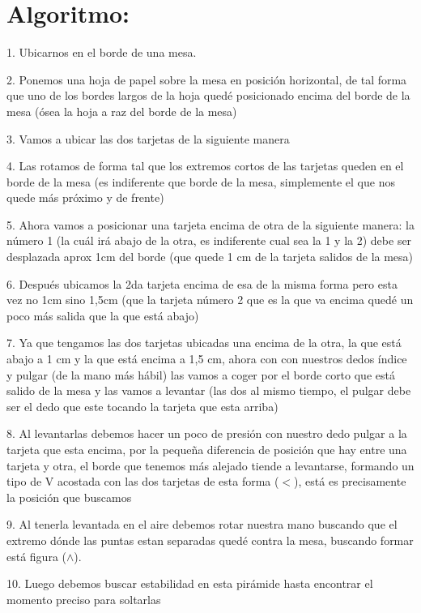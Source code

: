 \documentclass{article}
\begin{document}
\section{Algoritmo:} \label{contenido} 
1. Ubicarnos en el borde de una mesa.\par
2. Ponemos una hoja de papel sobre la mesa en posición horizontal, de tal forma que uno de los bordes largos de la hoja quedé posicionado encima del borde de la mesa (ósea la hoja a raz del borde de la mesa)\par
3. Vamos a ubicar las dos tarjetas de la siguiente manera\par
4. Las rotamos de forma tal que los extremos cortos de las tarjetas queden en el borde de la mesa (es indiferente que borde de la mesa, simplemente el que nos quede más próximo y de frente)\par
5. Ahora vamos a posicionar una tarjeta encima de otra de la siguiente manera: la número 1 (la cuál irá abajo de la otra, es indiferente cual sea la 1 y la 2) debe ser desplazada aprox 1cm del borde (que quede 1 cm de la tarjeta salidos de la mesa)\par
6. Después ubicamos la 2da tarjeta encima de esa de la misma forma pero esta vez no 1cm sino 1,5cm (que la tarjeta número 2 que es la que va encima quedé un poco más salida que la que está abajo)\par
7. Ya que tengamos las dos tarjetas ubicadas una encima de la otra, la que está abajo a 1 cm y la que está encima a 1,5 cm, ahora con con nuestros dedos índice y pulgar (de la mano más hábil) las vamos a coger por el borde corto que está salido de la mesa y las vamos a levantar (las dos al mismo tiempo, el pulgar debe ser el dedo que este tocando la tarjeta que esta arriba)\par
8. Al levantarlas debemos hacer un poco de presión con nuestro dedo pulgar a la tarjeta que esta encima, por la pequeña diferencia de posición que hay entre una tarjeta y otra, el borde que tenemos más alejado tiende a levantarse, formando un tipo de V acostada con las dos tarjetas de esta forma ($<$), está es precisamente la posición que buscamos\par
9. Al tenerla levantada en el aire debemos rotar nuestra mano buscando que el extremo dónde las puntas estan separadas quedé contra la mesa, buscando formar está figura ($\wedge$).\par
10. Luego debemos buscar estabilidad en esta pirámide hasta encontrar el momento preciso para soltarlas\par
\end{document}
